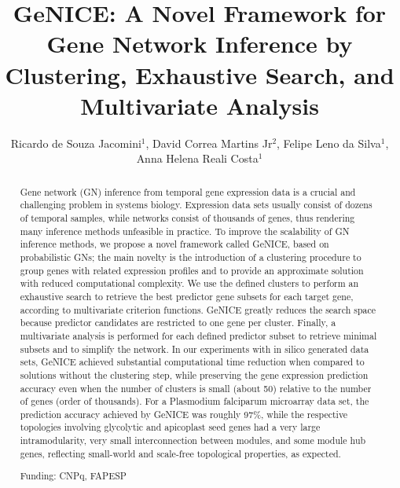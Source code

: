\documentclass[twoside]{article}
\title{\vspace{-15mm}\fontsize{24pt}{10pt}\selectfont\textbf{GeNICE: A Novel Framework for Gene Network Inference by Clustering, Exhaustive Search, and Multivariate Analysis}} %
\author{Ricardo de Souza Jacomini$^1$, David Correa Martins Jr$^2$, Felipe Leno da Silva$^1$, Anna Helena Reali Costa$^1$}
\affil{1 ESCOLA POLIT\'ECNICA DA USP\\ 2 UFABC\\ }
\date{}
\begin{document}
\maketitle %

\thispagestyle{fancy} %


\begin{abstract}
Gene network (GN) inference from temporal gene expression data is a crucial and challenging problem in systems biology. Expression data sets usually consist of dozens of temporal samples, while networks consist of thousands of genes, thus rendering many inference methods unfeasible in practice. To improve the scalability of GN inference methods, we propose a novel framework called GeNICE, based on probabilistic GNs; the main novelty is the introduction of a clustering procedure to group genes with related expression profiles and to provide an approximate solution with reduced computational complexity. We use the defined clusters to perform an exhaustive search to retrieve the best predictor gene subsets for each target gene, according to multivariate criterion functions. GeNICE greatly reduces the search space because predictor candidates are restricted to one gene per cluster. Finally, a multivariate analysis is performed for each defined predictor subset to retrieve minimal subsets and to simplify the network. In our experiments with in silico generated data sets, GeNICE achieved substantial computational time reduction when compared to solutions without the clustering step, while preserving the gene expression prediction accuracy even when the number of clusters is small (about 50) relative to the number of genes (order of thousands). For a Plasmodium falciparum microarray data set, the prediction accuracy achieved by GeNICE was roughly 97\%, while the respective topologies involving glycolytic and apicoplast seed genes had a very large intramodularity, very small interconnection between modules, and some module hub genes, reflecting small-world and scale-free topological properties, as expected.

Funding: CNPq, FAPESP
\end{abstract}
\end{document}
